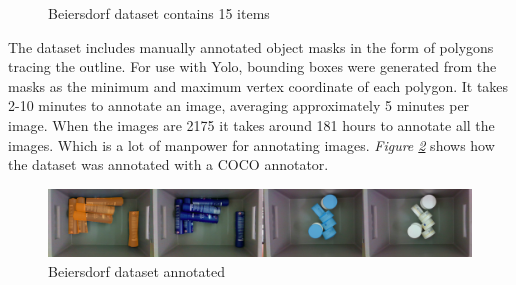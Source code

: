 \begin{figure}[h]
    \hfill
    \hfill
    \hfill
    \hfill
    \hfill
    \hfill
    \caption{Beiersdorf dataset contains 15 items\cite{bjarnason_detecting_2021}}
    \label{fig:beiersdorf}
\end{figure}
The dataset includes manually annotated object masks in the form of polygons tracing the outline.  For use with Yolo, bounding boxes were generated from the masks as the minimum and maximum vertex coordinate of each polygon.
It takes 2-10 minutes to annotate an image, averaging approximately 5 minutes per image. When the images are 2175 it takes around 181 hours to annotate all the images. Which is a lot of manpower for annotating images. \textit{Figure \ref{fig:beiersdorfanno}} shows how the dataset was annotated with a COCO annotator\cite{brooks_jsbrokscoco-annotator_2021}.
\begin{figure}[h]
    \centering
    \includegraphics[width=1\textwidth,  angle =0]{graphics/methods/sverrirannotated.PNG}
    \caption{Beiersdorf dataset annotated\cite{bjarnason_detecting_2021}}
    \label{fig:beiersdorfanno}
\end{figure}


